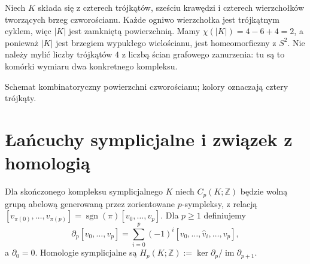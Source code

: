 \begin{przyklad}
Niech $K$ składa się z czterech trójkątów, sześciu krawędzi
i czterech wierzchołków tworzących brzeg czworościanu.
Każde ogniwo wierzchołka jest trójkątnym cyklem, więc
$|K|$ jest zamkniętą powierzchnią. Mamy
$\chi(|K|)=4-6+4=2$, a ponieważ $|K|$ jest brzegiem
wypukłego wielościanu, jest homeomorficzny z $S^2$.
Nie należy mylić liczby trójkątów $4$ z liczbą ścian
grafowego zanurzenia: tu są to komórki wymiaru dwa
konkretnego kompleksu.
\end{przyklad}

\begin{samepage}
\begin{center}
\begin{minipage}{.96\linewidth}\centering
{}\par\smallskip

{\footnotesize Schemat kombinatoryczny powierzchni czworościanu;
kolory oznaczają cztery trójkąty.}
\end{minipage}
\end{center}
\end{samepage}

\section{Łańcuchy symplicjalne i związek z homologią}
\label{sec:tg-simplicial-chain}

\begin{definicja}
Dla skończonego kompleksu symplicjalnego $K$ niech
$C_p(K;\mathbb Z)$ będzie wolną grupą abelową generowaną
przez zorientowane $p$-sympleksy, z relacją
$[v_{\pi(0)},\ldots,v_{\pi(p)}]
=\operatorname{sgn}(\pi)[v_0,\ldots,v_p]$.
Dla $p\ge1$ definiujemy
\[
\partial_p[v_0,\ldots,v_p]
=\sum_{i=0}^p(-1)^i
[v_0,\ldots,\widehat v_i,\ldots,v_p],
\]
a $\partial_0=0$. Homologie symplicjalne są
$H_p(K;\mathbb Z):=\ker\partial_p/\operatorname{im}\partial_{p+1}$.
\end{definicja}

